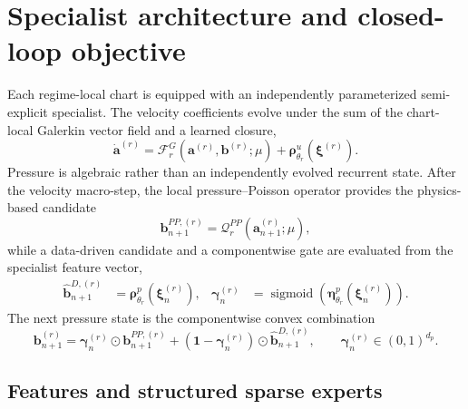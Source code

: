 \section{Specialist architecture and closed-loop objective}
\label{app:specialists}

Each regime-local chart is equipped with an independently parameterized
semi-explicit specialist. The velocity coefficients evolve under the sum of
the chart-local Galerkin vector field and a learned closure,
\begin{equation}
  \dot{\bm a}^{(r)}
  =
  \mathcal F_r^G\!\left(\bm a^{(r)},\bm b^{(r)};\mu\right)
  +\bm\rho^u_{\theta_r}\!\left(\bm\xi^{(r)}\right).
  \label{eq:app_hybrid_velocity_rhs}
\end{equation}
Pressure is algebraic rather than an independently evolved recurrent state.
After the velocity macro-step, the local pressure--Poisson operator provides
the physics-based candidate
\begin{equation}
  \bm b_{n+1}^{PP,(r)}
  =\mathcal Q_r^{PP}\!\left(\bm a_{n+1}^{(r)};\mu\right),
  \label{eq:app_pressure_poisson_candidate}
\end{equation}
while a data-driven candidate and a componentwise gate are evaluated from the
specialist feature vector,
\begin{align}
  \widehat{\bm b}_{n+1}^{D,(r)}
  &=\bm\rho^p_{\theta_r}\!\left(\bm\xi_n^{(r)}\right),
  &
  \bm\gamma_n^{(r)}
  &=\operatorname{sigmoid}\!\left(
      \bm\eta^p_{\theta_r}\!\left(\bm\xi_n^{(r)}\right)
    \right).
  \label{eq:app_pressure_candidates}
\end{align}
The next pressure state is the componentwise convex combination
\begin{equation}
  \bm b_{n+1}^{(r)}
  =\bm\gamma_n^{(r)}\odot\bm b_{n+1}^{PP,(r)}
  +\left(\bm 1-\bm\gamma_n^{(r)}\right)
   \odot\widehat{\bm b}_{n+1}^{D,(r)},
  \qquad \bm\gamma_n^{(r)}\in(0,1)^{d_p}.
  \label{eq:app_pressure_closure}
\end{equation}

\subsection{Features and structured sparse experts}


